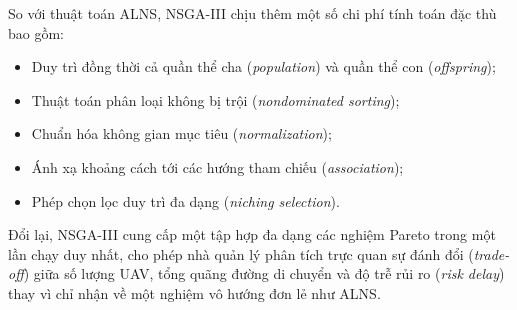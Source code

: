 \documentclass{article}
\begin{document}
So với thuật toán ALNS, NSGA-III chịu thêm một số chi phí tính toán đặc thù bao gồm:
\begin{itemize}
    \item Duy trì đồng thời cả quần thể cha (\textit{population}) và quần thể con (\textit{offspring});
    \item Thuật toán phân loại không bị trội (\textit{nondominated sorting});
    \item Chuẩn hóa không gian mục tiêu (\textit{normalization});
    \item Ánh xạ khoảng cách tới các hướng tham chiếu (\textit{association});
    \item Phép chọn lọc duy trì đa dạng (\textit{niching selection}).
\end{itemize}

Đổi lại, NSGA-III cung cấp một tập hợp đa dạng các nghiệm Pareto trong một lần chạy duy nhất, cho phép nhà quản lý phân tích trực quan sự đánh đổi (\textit{trade-off}) giữa số lượng UAV, tổng quãng đường di chuyển và độ trễ rủi ro (\textit{risk delay}) thay vì chỉ nhận về một nghiệm vô hướng đơn lẻ như ALNS.
\end{document}
